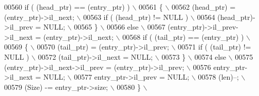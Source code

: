 \begin{DoxyCode}
00560 \textcolor{preprocessor}{       if ( (head\_ptr) == (entry\_ptr) )                                     \(\backslash\)}
00561 \textcolor{preprocessor}{       \{                                                                    \(\backslash\)}
00562 \textcolor{preprocessor}{          (head\_ptr) = (entry\_ptr)->il\_next;                                \(\backslash\)}
00563 \textcolor{preprocessor}{          if ( (head\_ptr) != NULL )                                         \(\backslash\)}
00564 \textcolor{preprocessor}{             (head\_ptr)->il\_prev = NULL;                                    \(\backslash\)}
00565 \textcolor{preprocessor}{       \}                                                                    \(\backslash\)}
00566 \textcolor{preprocessor}{       else                                                                 \(\backslash\)}
00567 \textcolor{preprocessor}{          (entry\_ptr)->il\_prev->il\_next = (entry\_ptr)->il\_next;             \(\backslash\)}
00568 \textcolor{preprocessor}{       if ( (tail\_ptr) == (entry\_ptr) )                                     \(\backslash\)}
00569 \textcolor{preprocessor}{       \{                                                                    \(\backslash\)}
00570 \textcolor{preprocessor}{          (tail\_ptr) = (entry\_ptr)->il\_prev;                                \(\backslash\)}
00571 \textcolor{preprocessor}{          if ( (tail\_ptr) != NULL )                                         \(\backslash\)}
00572 \textcolor{preprocessor}{             (tail\_ptr)->il\_next = NULL;                                    \(\backslash\)}
00573 \textcolor{preprocessor}{       \}                                                                    \(\backslash\)}
00574 \textcolor{preprocessor}{       else                                                                 \(\backslash\)}
00575 \textcolor{preprocessor}{          (entry\_ptr)->il\_next->il\_prev = (entry\_ptr)->il\_prev;             \(\backslash\)}
00576 \textcolor{preprocessor}{       entry\_ptr->il\_next = NULL;                                           \(\backslash\)}
00577 \textcolor{preprocessor}{       entry\_ptr->il\_prev = NULL;                                           \(\backslash\)}
00578 \textcolor{preprocessor}{       (len)--;                                                             \(\backslash\)}
00579 \textcolor{preprocessor}{       (Size) -= entry\_ptr->size;                                           \(\backslash\)}
00580 \textcolor{preprocessor}{    \}                                                                       \(\backslash\)}

\end{DoxyCode}
